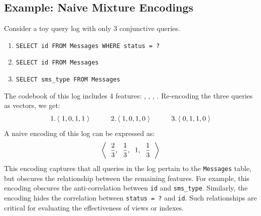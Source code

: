\subsection{Example: Naive Mixture Encodings}
\label{sec:naivemixtureencoding}
\noindent Consider a toy query log with only 3 conjunctive queries. \\[-5mm]
\begin{enumerate}
\item \lstinline{SELECT id FROM Messages WHERE status = ?}\\[-6mm]
\item \lstinline{SELECT id FROM Messages}\\[-6mm]
\item \lstinline{SELECT sms_type FROM Messages}\\[-5mm]
\end{enumerate}
The codebook of this log includes 4 features:
,
,
,
.
Re-encoding the three queries as vectors, we get: 
$$\text{1.}\tuple{1, 0, 1, 1} \hspace{10mm} \text{2.} \tuple{1, 0, 1, 0} \hspace{10mm} \text{3.} \tuple{0, 1, 1, 0}$$
A naive encoding of this log 
can be expressed as:
$$\left<\;{\hspace{1mm}\frac{2}{3}, \hspace{2mm} \frac{1}{3}, \hspace{2mm} 1, \hspace{2mm} \frac{1}{3}\hspace{1mm}}\;\right>$$
This encoding captures that all queries in the log pertain to the \lstinline{Messages} table, but obscures the relationship between the remaining features.
For example, this encoding obscures the anti-correlation between \lstinline{id} and \lstinline{sms_type}.
Similarly, the encoding hides the correlation between \lstinline{status = ?} and \lstinline{id}.  
Such relationships are critical for evaluating the effectiveness of views or indexes.


